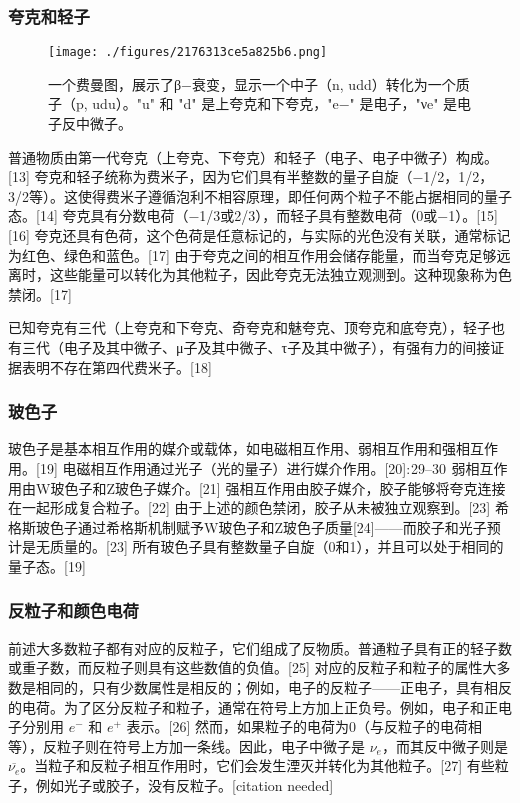 \subsubsection{夸克和轻子}
\begin{figure}[ht]
\centering
\texttt{[image: ./figures/2176313ce5a825b6.png]}
\caption{一个费曼图，展示了β−衰变，显示一个中子（n, udd）转化为一个质子（p, udu）。"u" 和 "d" 是上夸克和下夸克，"e−" 是电子，"νe" 是电子反中微子。} \label{fig_Partic_3}
\end{figure}
普通物质由第一代夸克（上夸克、下夸克）和轻子（电子、电子中微子）构成。[13] 夸克和轻子统称为费米子，因为它们具有半整数的量子自旋（−1/2，1/2，3/2等）。这使得费米子遵循泡利不相容原理，即任何两个粒子不能占据相同的量子态。[14] 夸克具有分数电荷（−1/3或2/3），而轻子具有整数电荷（0或−1）。[15][16] 夸克还具有色荷，这个色荷是任意标记的，与实际的光色没有关联，通常标记为红色、绿色和蓝色。[17] 由于夸克之间的相互作用会储存能量，而当夸克足够远离时，这些能量可以转化为其他粒子，因此夸克无法独立观测到。这种现象称为色禁闭。[17]

已知夸克有三代（上夸克和下夸克、奇夸克和魅夸克、顶夸克和底夸克），轻子也有三代（电子及其中微子、μ子及其中微子、τ子及其中微子），有强有力的间接证据表明不存在第四代费米子。[18]
\subsubsection{玻色子}  
玻色子是基本相互作用的媒介或载体，如电磁相互作用、弱相互作用和强相互作用。[19] 电磁相互作用通过光子（光的量子）进行媒介作用。[20]: 29–30  弱相互作用由W玻色子和Z玻色子媒介。[21] 强相互作用由胶子媒介，胶子能够将夸克连接在一起形成复合粒子。[22] 由于上述的颜色禁闭，胶子从未被独立观察到。[23] 希格斯玻色子通过希格斯机制赋予W玻色子和Z玻色子质量[24]——而胶子和光子预计是无质量的。[23] 所有玻色子具有整数量子自旋（0和1），并且可以处于相同的量子态。[19]
\subsubsection{反粒子和颜色电荷}  
前述大多数粒子都有对应的反粒子，它们组成了反物质。普通粒子具有正的轻子数或重子数，而反粒子则具有这些数值的负值。[25] 对应的反粒子和粒子的属性大多数是相同的，只有少数属性是相反的；例如，电子的反粒子——正电子，具有相反的电荷。为了区分反粒子和粒子，通常在符号上方加上正负号。例如，电子和正电子分别用 \( e^- \) 和 \( e^+ \) 表示。[26] 然而，如果粒子的电荷为0（与反粒子的电荷相等），反粒子则在符号上方加一条线。因此，电子中微子是 \( \nu_e \)，而其反中微子则是 \( \overline{\nu_e} \)。当粒子和反粒子相互作用时，它们会发生湮灭并转化为其他粒子。[27] 有些粒子，例如光子或胶子，没有反粒子。[citation needed]

